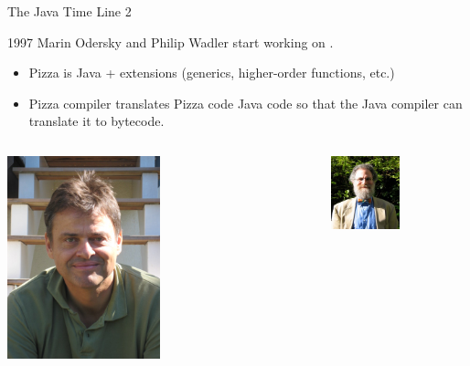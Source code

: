 \begin{frame}{The Java Time Line 2}
\begin{block}{1997}
Marin Odersky and Philip Wadler start working on .
\begin{itemize}
\item Pizza is Java + extensions (generics, higher-order functions, etc.)
\item Pizza compiler translates Pizza  code 
Java  code so that the Java compiler can translate it to bytecode.
\end{itemize}
\end{block}
\begin{columns}
	\begin{center}
	\includegraphics[width=0.5\textwidth]{resources/MartinOdersky.jpg}
	\end{center}
	\begin{center}
	\includegraphics[width=0.5\textwidth]{resources/PhilipWadler.jpg}
	\end{center}
\end{columns}
\end{frame}

